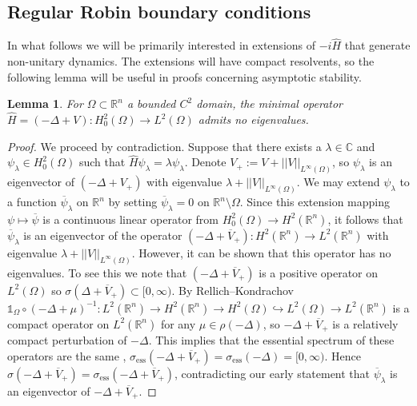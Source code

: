 \documentclass{article}
\numberwithin{equation}{section}
\newtheorem{lemma}{Lemma}[section]
\begin{document}
 \subsection{Regular Robin boundary conditions}
 In what follows we will be primarily interested in extensions of $-i\hat{H}$ that generate non-unitary dynamics. The extensions will have compact resolvents, so the following lemma will be useful in proofs concerning asymptotic stability.
 \begin{lemma}\label{no eigenvalues}
        For $\Omega \subset \mathbb{R}^n$ a bounded $C^2$ domain, the minimal operator $\hat{H}=(-\Delta+V):H^2_0(\Omega)\to L^2(\Omega)$ admits no eigenvalues.
    \end{lemma}
    \begin{proof}
        We proceed by contradiction. Suppose that there exists a $\lambda \in \mathbb{C}$ and $\psi_\lambda \in H^2_0(\Omega)$ such that $\hat{H}\psi_\lambda=\lambda \psi_\lambda$. Denote $V_+:=V+||V||_{L^\infty(\Omega)}$, so $\psi_\lambda$ is an eigenvector of $\left(-\Delta + V_+\right)$ with eigenvalue $\lambda + ||V||_{L^\infty(\Omega)}$. We may extend $\psi_\lambda$ to a function $\overline{\psi}_\lambda$ on $\mathbb{R}^n$ by setting $\overline\psi_\lambda=0$ on $\mathbb{R}^n\setminus \Omega$. Since this extension mapping $\psi \mapsto \overline{\psi}$ is a continuous linear operator \cite{Brezis} from $H^2_0(\Omega)\to H^2(\mathbb{R}^n)$, it follows that $\overline{\psi}_\lambda$ is an eigenvector of the operator $(-\Delta+\overline{V}_+):H^2(\mathbb{R}^n)\to L^2(\mathbb{R}^n)$ with eigenvalue $\lambda+||V||_{L^\infty(\Omega)}$. However, it can be shown that this operator has no eigenvalues. To see this we note that $(-\Delta+\overline{V}_+)$ is a positive operator on $L^2(\Omega)$ so $\sigma(\Delta+\overline V_+)\subset [0,\infty)$. By Rellich–Kondrachov \cite{Brezis} $\mathds{1}_{\Omega}\circ(-\Delta+\mu)^{-1}:L^2(\mathbb{R}^n)\to H^2(\mathbb{R}^n)\to H^2(\Omega)\hookrightarrow L^2(\Omega)\to L^2(\mathbb{R}^n) $ is a compact operator on $L^2(\mathbb{R}^n)$ for any $\mu \in \rho(-\Delta)$, so $-\Delta + \overline{V}_+$ is a relatively compact perturbation of $-\Delta$. This implies that the essential spectrum of these operators are the same \cite[Theorem 8.4.3]{Davies_1995}, $\sigma_\text{ess}(-\Delta + \overline{V}_+)=\sigma_\text{ess}(-\Delta)=[0,\infty)$. Hence  $\sigma(-\Delta + \overline{V}_+)=\sigma_\text{ess}(-\Delta+\overline V_+)$, contradicting our early statement that $\overline{\psi}_\lambda$ is an eigenvector of $-\Delta + \overline{V}_+$. 
    \end{proof}
\end{document}
